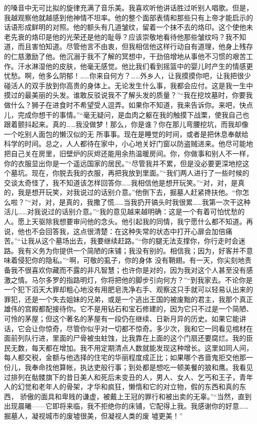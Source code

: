 \documentclass{article}
\begin{document}
\newpage
的嗓音中无可比拟的旋律充满了音乐美。我喜欢听他讲话胜过听别人唱歌。但是，我越观察他就越感到他神情不坦率。他的整个面部表情和那些只有上帝才能启示的话语形成鲜明的对照。他的额头有几道皱纹，留着一个抹不去的烙印。这个使他未老先衰的烙印是他的光荣还是他的耻辱？应该崇敬地看待他那些皱纹吗？我不知道，而且害怕知道。尽管他言不由衷，但我相信他这样行动自有道理，他身上残存的仁慈激励了他。他沉溺于我不了解的冥想中，干劲倍增地从事他不习惯的艰苦工作。汗水淋湿他的皮肤，他毫无感觉。他比我们看到摇篮中的婴儿时产生的情感更忧愁。啊，他多么阴郁！……你来自何方？……外乡人，让我摸摸你吧，让我把很少碰活人的双手放到你高贵的身体上。无论发生什么事，我都会应付。这是我一生中摸过的最美丽的头发。谁敢反驳说我不了解头发的质量？”“我在挖坟墓时，你要我做什么？狮子在进食时不希望受人逗弄。如果你不知道，我来告诉你。来吧，快点儿，完成你想干的事情。”“毫无疑问，是血肉之躯在我的触摸下战栗，使我自己也跟着颤抖起来。真的……我没做梦！那么，你是谁？你在那儿弯腰挖坑，而我却像一个吃别人面包的懒汉似的无
\newpage
所事事。现在是睡觉的时间，或者是把休息奉献给科学的时间。总之，人人都待在家中，小心地关好门窗以防盗贼进来。他尽可能地把自己关在房里，旧壁炉的灰烬还能用余热温暖房间。你，你做事和别人不一样，你的衣服显出你是一个遥远国家的居民。”“尽管我并不累，但是没必要更深地挖这个墓坑。现在，你脱去我的衣服，再把我放到里面。”“我们两人进行了一些时候的交谈太奇怪了，我不知道该怎样回答你……我相信他是想开玩笑。”“对，对，是真的，我是想开玩笑，对我说过的话别介意。”他倒下去，掘墓人赶紧搀扶他。“你怎么啦？”“对，对，是真的，我撒了慌……当我扔开镐头时我很累……我第一次干这种活儿……对我说过的话别介意。”“我的意见越来越明确：这是一个有着可怕忧愁的人。愿上天驱除我想要审问他的念头。他引起我的同情，我宁愿什么都不知道。再说，他也不会回答我，这点很清楚：在这种失常的状态中打开心扉会加倍痛苦。”“让我从这个墓场出去，我要继续赶路。”“你的腿无法支撑你，你行走时会迷路。我有义务为你提供一个简陋的床铺；我没有别的。相信我；因为，好客并不意味着侵犯你的隐私。”“啊，可敬的虱子，你的身体
\newpage
没有鞘翅。有一天，你尖刻地责备我不很喜欢你藏而不露的非凡智慧；也许你是对的，因为我对这个人甚至没有感激之情。马尔多罗的指路明灯，你将把他的脚步引向何方？”“到我家去。不论你是一个犯下滔天大罪却粗心地没有用肥皂洗净右手、观察这只手就可以轻易认出来的罪犯，还是一个失去姐妹的兄弟，或是一个逃出王国的被废黜的君主，我那个真正雄伟的宫殿都配接待你。它不是用钻石和宝石修建的，因为它只不过是一个简陋、可怜的茅屋；但这个著名的茅屋有一段仍在继续、日新月异的历史。如果它能讲话，它会让你惊奇，尽管你似乎对一切都不惊奇。多少次，我和它一同看见棺材在面前列队行进，里面的尸骨被虫蛀蚀，比我靠在上面的这个门扇还要腐烂。我的臣民无数，每天都在增加。我不用定期清点人数就能发现这种增长。这里如同人间，每人都交税，金额与他选择的住宅的华丽程度成正比；如果哪个吝啬鬼拒交他那一份儿，我奉命找他算帐，执达吏般行事；到处都是想吃一顿美餐的狼和鹰。我看见过排列在骷髅旗下的昔日美人和死后未变丑的人，男人、女人、乞丐和王子，青年人的幻觉和老年人的骨架，才华和疯狂，懒惰和它的对立物，假的东西和真的东西，
\newpage
骄傲的面具和卑贱的谦虚，被戴上王冠的罪行和被出卖的无辜。”“当然，直到出现晨曦——它即将来临，我不拒绝你的床铺，它配得上我。我感谢你的好意……掘墓人，凝视城市的废墟很美，但凝视人类的废
墟更美！” 
\end{document}
